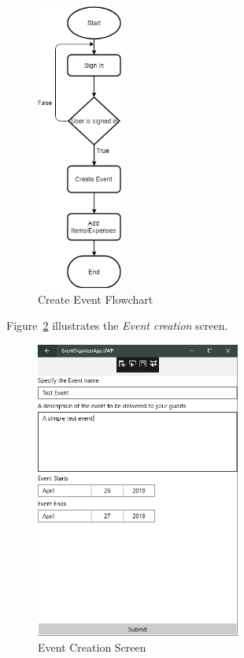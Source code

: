 \begin{figure}[!ht]
	\centering
	\includegraphics[width=0.25\textwidth,height=0.50\textheight]{./Chapter3/Figures/Flowcharts/CreateEventFlowChart}
	\caption{Create Event Flowchart}
	\label{fig:CreateEvent}
\end{figure}

\newpage

Figure~\ref{fig:CreateEventScreenShot} illustrates the \textit{Event creation} screen.

\begin{figure}[!ht]
	\centering
	\includegraphics[width=0.60\textwidth,height=0.50\textheight]{./Chapter3/Figures/ClientAppScreenShots/CreateEvent04}
	\caption{Event Creation Screen}
	\label{fig:CreateEventScreenShot}
\end{figure}

